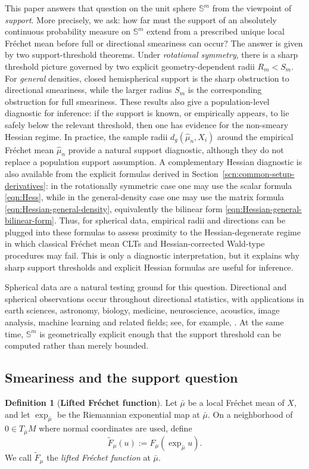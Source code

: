\documentclass{amsart}
\theoremstyle{definition}
\newtheorem{definition}[theorem]{Definition}
\theoremstyle{remark}
\newcommand{\mubar}{\bar{\mu}}
\newcommand\0{\boldsymbol{0}}
\begin{document}
This paper answers that question on the unit sphere \(\mathbb S^m\) from the viewpoint of \textit{support}. More precisely, we ask: how far must the support of an absolutely continuous probability measure on \(\mathbb S^m\) extend from a prescribed unique local Fr\'echet mean before full or directional smeariness can occur? The answer is given by two support-threshold theorems. Under \textit{rotational symmetry}, there is a sharp threshold picture governed by two explicit geometry-dependent radii \(R_m<S_m\). For \textit{general} densities, closed hemispherical support is the sharp obstruction to directional smeariness, while the larger radius \(S_m\) is the corresponding obstruction for full smeariness. These results also give a population-level diagnostic for inference: if the support is known, or empirically appears, to lie safely below the relevant threshold, then one has evidence for the non-smeary Hessian regime. In practice, the sample radii \(d_g(\hat\mu_n,X_i)\) around the empirical Fr\'echet mean \(\hat\mu_n\) provide a natural support diagnostic, although they do not replace a population support assumption. A complementary Hessian diagnostic is also available from the explicit formulas derived in Section~\ref{scn:common-setup-derivatives}: in the rotationally symmetric case one may use the scalar formula \eqref{eqn:Hess}, while in the general-density case one may use the matrix formula \eqref{eqn:Hessian-general-density}, equivalently the bilinear form \eqref{eqn:Hessian-general-bilinear-form}. Thus, for spherical data, empirical radii and directions can be plugged into these formulas to assess proximity to the Hessian-degenerate regime in which classical Fr\'echet mean CLTs and Hessian-corrected Wald-type procedures may fail. This is only a diagnostic interpretation, but it explains why sharp support thresholds and explicit Hessian formulas are useful for inference.

Spherical data are a natural testing ground for this question.  Directional and spherical observations occur throughout directional statistics, with applications in earth sciences, astronomy, biology, medicine, neuroscience, acoustics, image analysis, machine learning and related fields; see, for example, \citet{FisherLewisEmbleton1993SphericalData,MardiaJupp2000DirectionalStatistics,PewseyGarciaPortugues2021Directional}.  At the same time, \(\mathbb S^m\) is geometrically explicit enough that the support threshold can be computed rather than merely bounded.

\subsection{Smeariness and the support question}
\begin{definition}[\textbf{Lifted Fr\'echet function}]
\label{def:lifted-Frechet-function}
Let \(\mubar\) be a local Fr\'echet mean of \(X\), and let \(\exp_{\mubar}\) be the Riemannian exponential map at \(\mubar\). On a neighborhood of \(0\in T_{\mubar}M\) where normal coordinates are used, define
\[
    \widetilde F_\mu(u):=F_\mu(\exp_{\mubar}u).
\]
We call \(\widetilde F_\mu\) the \emph{lifted Fr\'echet function} at \(\mubar\).
\end{definition}
\end{document}
